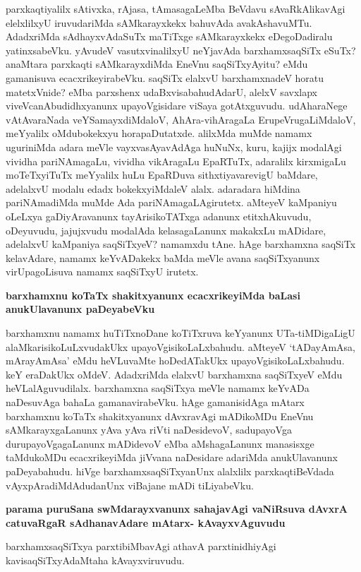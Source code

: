 \noindent
parxkaqtiyalilx sAtivxka, rAjasa, tAmasagaLeMba BeVdavu sAvaRkAlikavAgi elelxlilxyU iruvudariMda sAMkarayxkekx bahuvAda avakAshavuMTu. AdadxriMda sAdhayxvAdaSuTx maTiTxge sAMkarayxkekx eDegoDadiralu yatinxsabeVku. yAvudeV vasutxvinalilxyU neYjavAda barxhamxsaqSiTx eSuTx? anaMtara parxkaqti sAMkarayxdiMda EneVnu saqSiTxyAyitu? eMdu gamanisuva ecacxrikeyirabeVku. saqSiTx elalxvU barxhamxnadeV horatu matetxVnide? eMba parxshenx udaBxvisabahudAdarU, alelxV savxlapx viveVcanAbudidhxyanunx upayoVgisidare viSaya gotAtxguvudu. udAharaNege vAtAvaraNada veYSamayxdiMdaloV, AhAra-vihAragaLa ErupeVrugaLiMdaloV, meYyalilx oMdubokekxyu horapaDutatxde. alilxMda muMde namamx uguriniMda adara meVle vayxvasAyavAdAga huNuNx, kuru, kajijx modalAgi vividha pariNAmagaLu, vividha vikAragaLu EpaRTuTx, adaralilx kirxmigaLu moTeTxyiTuTx meYyalilx huLu EpaRDuva sithxtiyavarevigU baMdare, adelalxvU modalu edadx bokekxyiMdaleV alalx. adaradara hiMdina pariNAmadiMda muMde Ada pariNAmagaLAgirutetx. aMteyeV kaMpaniyu oLeLxya gaDiyAravanunx tayArisikoTATxga adanunx etitxhAkuvudu, oDeyuvudu, jajujxvudu modalAda kelasagaLanunx makakxLu mADidare, adelalxvU kaMpaniya saqSiTxyeV? namamxdu tAne. hAge barxhamxna saqSiTx kelavAdare, namamx keYvADakekx baMda meVle avana saqSiTxyanunx virUpagoLisuva namamx saqSiTxyU irutetx.

{\bigskip
\noindent
{\large\bf barxhamxnu koTaTx shakitxyanunx ecacxrikeyiMda baLasi anukUlavanunx paDeyabeVku}}\label{page193}
\smallskip

\noindent
barxhamxnu namamx huTiTxnoDane koTiTxruva keYyanunx UTa-tiMDigaLigU alaMkarisikoLuLxvudakUkx upayoVgisikoLaLxbahudu. aMteyeV `tADayAmAsa, mArayAmAsa' eMdu heVLuvaMte hoDedATakUkx upayoVgisikoLaLxbahudu. keY eraDakUkx oMdeV. AdadxriMda elalxvU barxhamxna saqSiTxyeV eMdu heVLalAguvudilalx. barxhamxna saqSiTxya meVle namamx keYvADa naDesuvAga bahaLa gamanavirabeVku. hAge gamanisidAga mAtarx barxhamxnu koTaTx shakitxyanunx dAvxravAgi mADikoMDu EneVnu sAMkarayxgaLanunx yAva yAva riVti naDesidevoV, sadupayoVga durupayoVgagaLanunx mADidevoV eMba aMshagaLanunx manasisxge taMdukoMDu ecacxrikeyiMda jiVvana naDesidare adariMda anukUlavanunx paDeyabahudu. hiVge barxhamxsaqSiTxyanUnx alalxlilx parxkaqtiBeVdada vAyxpAradiMdAdudanUnx viBajane mADi tiLiyabeVku.

{\bigskip
\noindent
{\large\bf parama puruSana swMdarayxvanunx sahajavAgi vaNiRsuva dAvxrA catuvaRgaR sAdhanavAdare mAtarx- kAvayxvAguvudu}}\label{page193a}
\medskip

\noindent
barxhamxsaqSiTxya parxtibiMbavAgi athavA parxtinidhiyAgi kavisaqSiTxyAdaMtaha kAvayxviruvudu. 

